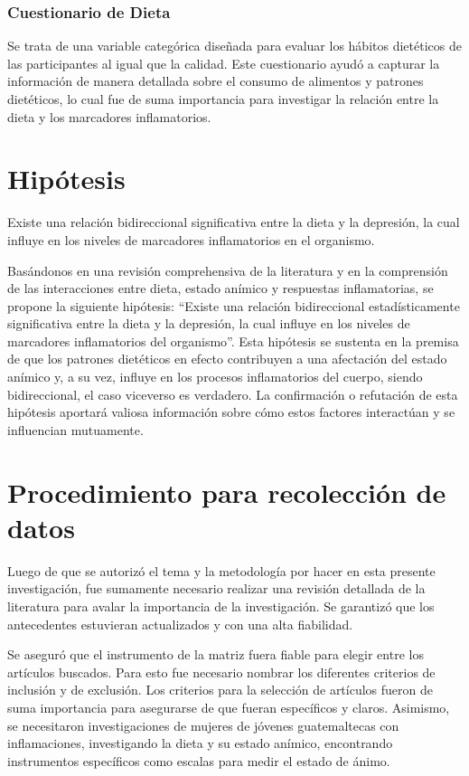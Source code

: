 \documentclass[jou]{apa7}
\begin{document}
	\subsubsection{Cuestionario de Dieta}
	Se trata de una variable categórica diseñada para evaluar los hábitos dietéticos de las participantes al igual que la calidad. Este cuestionario ayudó a capturar la información de manera detallada sobre el consumo de alimentos y patrones dietéticos, lo cual fue de suma importancia para investigar la relación entre la dieta y los marcadores inflamatorios.



	\section{Hipótesis}\label{hipuxf3tesis}

	Existe una relación bidireccional significativa entre la dieta y la
	depresión, la cual influye en los niveles de marcadores inflamatorios en
	el organismo.

	Basándonos en una revisión comprehensiva de la literatura y en la
	comprensión de las interacciones entre dieta, estado anímico y
	respuestas inflamatorias, se propone la siguiente hipótesis: ``Existe una
	relación bidireccional estadísticamente significativa entre la dieta y
	la depresión, la cual influye en los niveles de marcadores inflamatorios
	del organismo''. Esta hipótesis se sustenta en la premisa de que los
	patrones dietéticos en efecto contribuyen a una afectación del estado
	anímico y, a su vez, influye en los procesos inflamatorios del cuerpo,
	siendo bidireccional, el caso viceverso es verdadero. La confirmación o
	refutación de esta hipótesis aportará valiosa información sobre cómo
	estos factores interactúan y se influencian mutuamente.

	\section{Procedimiento para recolección de datos}\label{procedimiento-para-recolecciuxf3n-de-datos}

	Luego de que se autorizó el tema y la metodología por hacer en
	esta presente investigación, fue sumamente necesario realizar una
	revisión detallada de la literatura para avalar la importancia de la
	investigación. Se garantizó que los antecedentes estuvieran actualizados y
	con una alta fiabilidad.

	Se aseguró que el instrumento de la matriz fuera fiable para elegir entre los artículos buscados. Para esto fue necesario nombrar los diferentes criterios de inclusión y de exclusión. Los criterios para la selección de artículos fueron de suma importancia para asegurarse de que fueran específicos y claros. Asimismo, se necesitaron investigaciones de mujeres de jóvenes guatemaltecas con inflamaciones, investigando la dieta y su estado anímico, encontrando instrumentos específicos como escalas para medir el estado de ánimo.
\end{document}
